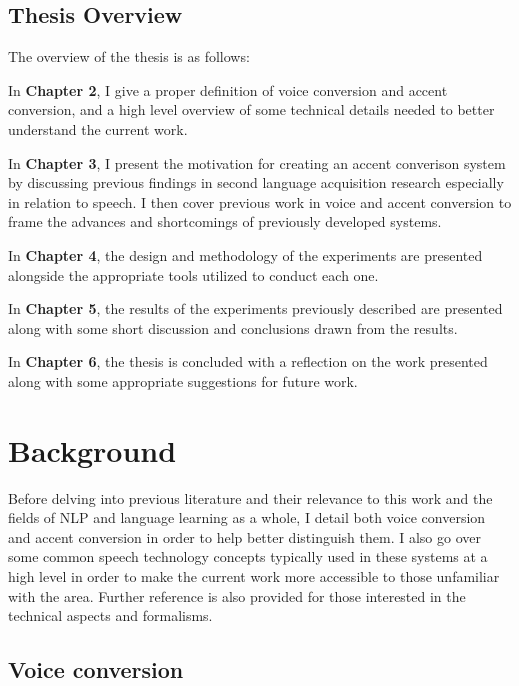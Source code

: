 \documentclass
[
    a4paper,
    twoside,
    12pt,
]
{report}
\begin{document}
\hypertarget{thesis-overview}{%
\section{Thesis Overview}\label{thesis-overview}}

The overview of the thesis is as follows:

In \textbf{Chapter 2}, I give a proper definition of voice conversion
and accent conversion, and a high level overview of some technical
details needed to better understand the current work.

In \textbf{Chapter 3}, I present the motivation for creating an accent
converison system by discussing previous findings in second language
acquisition research especially in relation to speech. I then cover
previous work in voice and accent conversion to frame the advances and
shortcomings of previously developed systems.

In \textbf{Chapter 4}, the design and methodology of the experiments are
presented alongside the appropriate tools utilized to conduct each one.

In \textbf{Chapter 5}, the results of the experiments previously
described are presented along with some short discussion and conclusions
drawn from the results.

In \textbf{Chapter 6}, the thesis is concluded with a reflection on the
work presented along with some appropriate suggestions for future work.
\cleardoublepage

\chapter{Background}

Before delving into previous literature and their relevance to this work
and the fields of NLP and language learning as a whole, I detail both
voice conversion and accent conversion in order to help better
distinguish them. I also go over some common speech technology concepts
typically used in these systems at a high level in order to make the
current work more accessible to those unfamiliar with the area. Further
reference is also provided for those interested in the technical aspects
and formalisms.

\hypertarget{voice-conversion}{%
\section{Voice conversion}\label{voice-conversion}}
\end{document}
